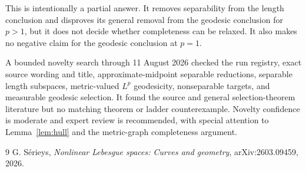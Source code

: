 \documentclass[11pt]{article}
\begin{document}
This is intentionally a partial answer.  It removes separability from the
length conclusion and disproves its general removal from the geodesic
conclusion for $p>1$, but it does not decide whether completeness can be
relaxed.  It also makes no negative claim for the geodesic conclusion at
$p=1$.

A bounded novelty search through 11 August 2026 checked the run registry,
exact source wording and title, approximate-midpoint separable reductions,
separable length subspaces, metric-valued $L^p$ geodesicity, nonseparable
targets, and measurable geodesic selection.  It found the source and general
selection-theorem literature but no matching theorem or ladder counterexample.
Novelty confidence is moderate and expert review is recommended, with special
attention to Lemma~\ref{lem:hull} and the metric-graph completeness argument.

\begin{thebibliography}{9}
G. S\'erieys,
\emph{Nonlinear Lebesgue spaces: Curves and geometry},
arXiv:2603.09459, 2026.
\end{thebibliography}
\end{document}
